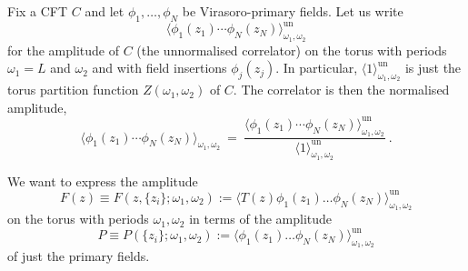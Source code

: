 \documentclass[11pt,a4paper]{article}
\numberwithin{equation}{section}
\begin{document}
Fix a CFT $C$ and let $\phi_1,\dots,\phi_N$ be Virasoro-primary fields. 
Let us write 
%
\begin{equation}\label{eq:torus-correlator-unnormalised}
\big\langle \phi_1(z_1) \cdots \phi_N(z_N)
\big\rangle^\mathrm{un}_{\omega_1,\omega_2}
\end{equation}
%
for the amplitude of $C$ (the unnormalised correlator) on the torus with periods $\omega_1=L$ and $\omega_2$ and with field insertions $\phi_j(z_j)$. In particular, $\langle 1 \rangle^\mathrm{un}_{\omega_1,\omega_2}$ is just the torus partition function $Z(\omega_1,\omega_2)$ of $C$.
The correlator is then the normalised amplitude, 
\begin{equation}
\big\langle \phi_1(z_1) \cdots \phi_N(z_N) \big\rangle_{\omega_1,\omega_2} ~=~ \frac{\big\langle \phi_1(z_1) \cdots \phi_N(z_N) \big\rangle^\mathrm{un}_{\omega_1,\omega_2}}{\langle 1 \rangle^\mathrm{un}_{\omega_1,\omega_2}}~.
\end{equation}

\noindent
We want to express the amplitude
\begin{equation}
F(z) \equiv F(z,\{z_i\};\omega_1,\omega_2) := \big\langle T(z) \phi_1(z_1) \dots \phi_N(z_N)\big\rangle_{\omega_1,\omega_2}^\mathrm{un}
\end{equation}
on the torus with periods $\omega_1,\omega_2$ in terms of the amplitude
\begin{equation}
P \equiv P(\{z_i\};\omega_1,\omega_2) := \big\langle \phi_1(z_1) \dots \phi_N(z_N)\big\rangle_{\omega_1,\omega_2}^\mathrm{un}
\end{equation}
of just the primary fields. 
\end{document}
